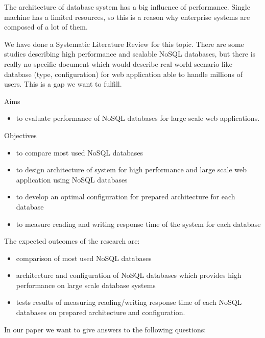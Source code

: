 \documentclass[times, 10pt,twocolumn]{article}
\begin{document}
The architecture of database system has a big influence of performance. Single machine has a limited
resources, so this is a reason why enterprise systems are composed of a lot of them.

We have done a Systematic Literature Review for this topic. There are some studies describing high performance 
and scalable NoSQL databases, but there is really no specific document which would describe real world scenario like 
database (type, configuration) for web application able to handle millions of users. This is a gap we want to fulfill.


Aims
\begin{itemize}
	\item to evaluate performance of NoSQL databases for large scale web applications.
\end{itemize}

Objectives
\begin{itemize}
	\item to compare most used NoSQL databases
	\item to design architecture of system for high performance and large scale web application using NoSQL databases
	\item to develop an optimal configuration for prepared architecture for each database
	\item to measure reading and writing response time of the system for each database
\end{itemize}



The expected outcomes of the research are:

\begin{itemize}
  \item comparison of most used NoSQL databases
  \item architecture and configuration of NoSQL databases which provides high performance on large scale database systems
  \item tests results of measuring reading/writing response time of each NoSQL databases on prepared architecture and configuration.
\end{itemize}


In our paper we want to give answers to the following questions:
\end{document}
